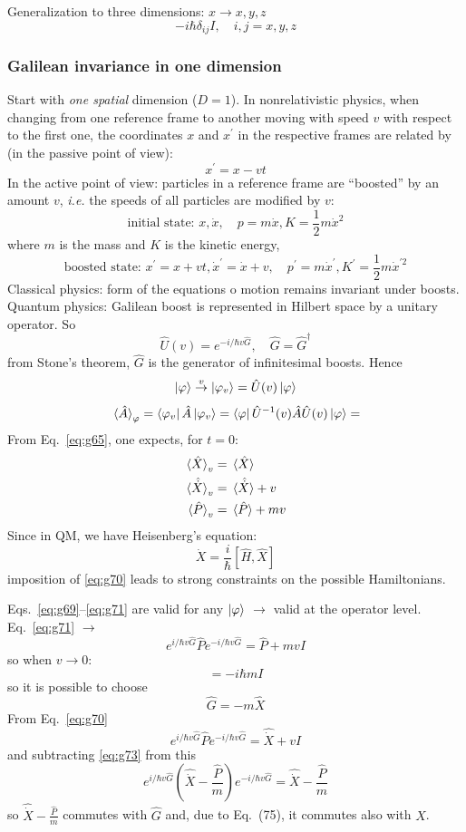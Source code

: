 \documentclass[12pt]{article}
\newcommand{\be}{\begin{equation}}
\newcommand{\ee}{\end{equation}}
\begin{document}
Generalization to three dimensions: $x\to x,y,z$ 
\be
[\hat{X}_i, \hat{P}_j] - i\hbar \delta_{ij} I,\quad i,j = x,y,z
\ee

\subsubsection{Galilean invariance in one dimension}

Start with \emph{one spatial} dimension ($D=1$). In nonrelativistic
physics, when changing from one reference frame to another
moving with speed $v$ with respect to the first one,
the coordinates $x$ and $x^\prime$ in the respective frames
are related by (in the passive point of view):
\be
x^\prime = x-vt
\ee
In the active point of view: particles in a reference
frame are ``boosted'' by an amount $v$, \textit{i.e.} the speeds
of all particles are modified by $v$:
\be
\text{initial state: } x,\dot{x},\quad p = m\dot{x}, K = \frac{1}{2} m \dot{x}^2
\ee
where $m$ is the mass and $K$ is the kinetic energy,
\be
\text{boosted state: } x^\prime=x+vt,\dot{x}^\prime = \dot{x}+v,\quad p^\prime = m\dot{x}^\prime, K^\prime = \frac{1}{2} m \dot{x}^{\prime2}
\label{eq:g65}
\ee
Classical physics: form of the equations o motion
remains invariant under boosts.\\
Quantum physics: Galilean boost is represented in
Hilbert space by a unitary operator. So
\be
\hat{U}(v) = e^{-i/\hbar v \hat{G}},\quad \hat{G} = \hat{G}^\dagger
\ee
from Stone's theorem, $\hat{G}$ is the
generator of infinitesimal
boosts. Hence
\be
\ket{\varphi} \stackrel{v}{\to} \ket{\varphi_v} = \hat{U}(v)\ket{\varphi}
\ee
%
\be
\ev*{\hat{A}}_\varphi = 
\bra{\varphi_v}\hat{A}\ket{\varphi_v} = 
\bra{\varphi}\hat{U}^{-1}(v)\hat{A}\hat{U}(v)\ket{\varphi} = 
\ee
From Eq.~\eqref{eq:g65},
one expects, for $t = 0$:
\begin{align}
\ev*{\hat{X}}_v &= \ev*{\hat{X}} \label{eq:g69}\\
\ev*{\hat{\dot{X}}}_v &= \ev*{\hat{\dot{X}}} + v \label{eq:g70}\\
\ev*{\hat{P}}_v &= \ev*{\hat{P}} + mv \label{eq:g71}
\end{align}
Since in QM, we have Heisenberg's equation:
\be
\dot{X} = \frac{i}{\hbar} [\hat{H},\hat{X}]
\ee
imposition of \eqref{eq:g70}
leads to strong constraints on
the possible Hamiltonians.

Eqs.~\eqref{eq:g69}--\eqref{eq:g71} are valid for any $\ket{\varphi}$ $\to$ valid at the
operator level. Eq.~\eqref{eq:g71} $\to$
%
\be
e^{i/\hbar v \hat{G}} \hat{P} e^{-i/\hbar v \hat{G}} =
\hat{P} + m v I
\label{eq:g73}
\ee	
so when $v \to 0$:
\be
[\hat{G},\hat{P}] = -i\hbar m I
\ee
so it is possible to choose
\be
\hat{G} = -m \hat{X}
\ee
From Eq.~\eqref{eq:g70}
\be
e^{i/\hbar v \hat{G}} \hat{P} e^{-i/\hbar v \hat{G}} =
\hat{\dot{X}} + v I
\ee
and subtracting \eqref{eq:g73} from this
\be
e^{i/\hbar v \hat{G}}
\left(\hat{\dot{X}} - \frac{\hat{P}}{m}\right) 
e^{-i/\hbar v \hat{G}} =
\hat{\dot{X}} - \frac{\hat{P}}{m}
\ee
so $\hat{\dot{X}} - \frac{\hat{P}}{m}$ commutes with $\hat{G}$ and, due to
Eq.~(75), it commutes also with $\hat{X}$.
\end{document}
